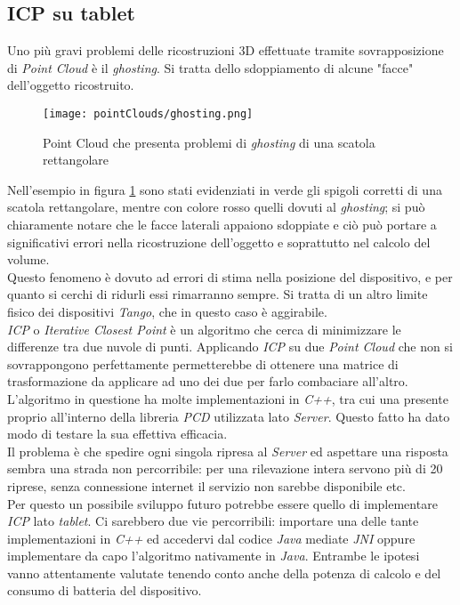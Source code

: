 \subsection{ICP su tablet}\label{subs:ICP}
Uno più gravi problemi delle ricostruzioni 3D effettuate tramite sovrapposizione di \emph{Point Cloud} è il \emph{ghosting}. Si tratta dello sdoppiamento di alcune "facce" dell'oggetto ricostruito.\\
\begin{figure}[!h] 
    \centering 
    \texttt{[image: pointClouds/ghosting.png]} 
    \caption{Point Cloud che presenta problemi di \emph{ghosting} di una scatola rettangolare}
    \label{figure:pcloud_ghosting}
\end{figure}
Nell'esempio in figura \ref{figure:pcloud_ghosting} sono stati evidenziati in verde gli spigoli corretti di una scatola rettangolare, mentre con colore rosso quelli dovuti al \emph{ghosting}; si può chiaramente notare che le facce laterali appaiono sdoppiate e ciò può portare a significativi errori nella ricostruzione dell'oggetto e soprattutto nel calcolo del volume.\\
Questo fenomeno è dovuto ad errori di stima nella posizione del dispositivo, e per quanto si cerchi di ridurli essi rimarranno sempre. Si tratta di un altro limite fisico dei dispositivi \emph{Tango}, che in questo caso è aggirabile.\\
\emph{ICP} o \emph{Iterative Closest Point} è un algoritmo che cerca di minimizzare le differenze tra due nuvole di punti. Applicando \emph{ICP} su due \emph{Point Cloud} che non si sovrappongono perfettamente permetterebbe di ottenere una matrice di trasformazione da applicare ad uno dei due per farlo combaciare all'altro. L'algoritmo in questione ha molte implementazioni in \emph{C++}, tra cui una presente proprio all'interno della libreria \emph{PCD} utilizzata lato \emph{Server}. Questo fatto ha dato modo di testare la sua effettiva efficacia.\\
Il problema è che spedire ogni singola ripresa al \emph{Server} ed aspettare una risposta sembra una strada non percorribile: per una rilevazione intera servono più di 20 riprese, senza connessione internet il servizio non sarebbe disponibile etc.\\
Per questo un possibile sviluppo futuro potrebbe essere quello di implementare \emph{ICP} lato \emph{tablet}. Ci sarebbero due vie percorribili: importare una delle tante implementazioni in \emph{C++} ed accedervi dal codice \emph{Java} mediate \emph{JNI} oppure implementare da capo l'algoritmo nativamente in \emph{Java}. Entrambe le ipotesi vanno attentamente valutate tenendo conto anche della potenza di calcolo e del consumo di batteria del dispositivo.

